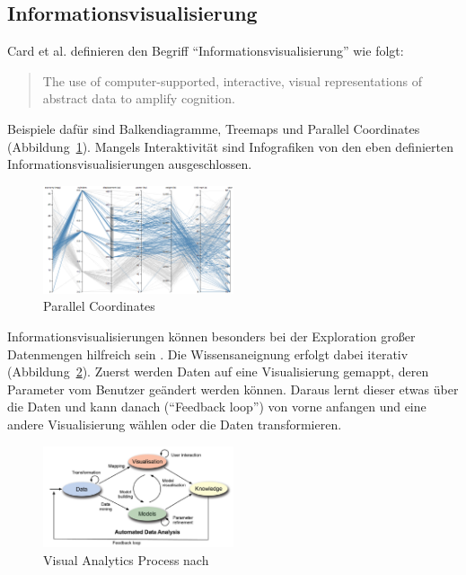 \documentclass[
	headsepline,
	footsepline,
	fontsize=12pt,
	bibliography=totoc
]{scrbook}
\begin{document}
\subsection{Informationsvisualisierung}
\label{section:standderforschung:grundlagen:informationsvisualisierung}


Card et al. \cite{Card1999} definieren den Begriff \enquote{Informationsvisualisierung} wie folgt:

\begin{quote}
The use of computer-supported, interactive, visual representations of abstract data to amplify cognition.
\end{quote}

Beispiele dafür sind Balkendiagramme, Treemaps \cite{Shneiderman1992} und Parallel Coordinates \cite{Inselberg1991} (Abbildung~\ref{figure:parallel_coordinates}). Mangels Interaktivität sind Infografiken \cite{Smiciklas2012} von den eben definierten Informationsvisualisierungen ausgeschlossen.

\begin{figure}[htbp]
   \centering
   \includegraphics[width=0.5\textwidth]{images/grundlagen-parallel_coordinates.png} 
   \caption{Parallel Coordinates}
   \label{figure:parallel_coordinates}
\end{figure}


Informationsvisualisierungen können besonders bei der Exploration großer Datenmengen hilfreich sein \cite{Kohlhammer2011}. Die Wissensaneignung erfolgt dabei iterativ (Abbildung~\ref{figure:visual_analytics_process}). Zuerst werden Daten auf eine Visualisierung gemappt, deren Parameter vom Benutzer geändert werden können. Daraus lernt dieser etwas über die Daten und kann danach (\enquote{Feedback loop}) von vorne anfangen und eine andere Visualisierung wählen oder die Daten transformieren.

\begin{figure}[htbp]
   \centering
   \includegraphics[width=0.5\textwidth]{images/grundlagen-visual_analytics_process.png} 
   \caption{Visual Analytics Process nach \cite{Kohlhammer2011}}
   \label{figure:visual_analytics_process}
\end{figure}
\end{document}
